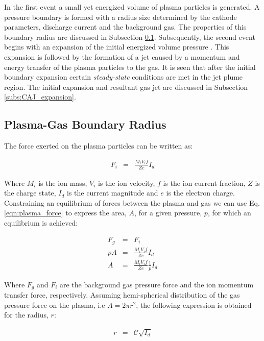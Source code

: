 \documentclass[a4paper]{iacas}%
\begin{document}
In the first event a small yet energized volume of plasma particles is generated. A pressure boundary is formed with a radius size determined by the cathode parameters, discharge current and the background gas. The properties of this boundary radius are discussed in Subsection \ref{subs:boundary_radius}. 
Subsequently, the second event begins with an expansion of the initial energized volume pressure \cite{meunier1987experimental}. This expansion is followed by the formation of a jet caused by a momentum and energy transfer of the plasma particles to the gas. It is seen that after the initial boundary expansion certain \textit{steady-state} conditions are met in the jet plume region. The initial expansion and resultant gas jet are discussed in Subsection \ref{subs:CAJ_expansion}. 

\subsection{Plasma-Gas Boundary Radius}\label{subs:boundary_radius}

The force exerted on the plasma particles can be written as:

\begin{eqnarray}\label{eqn:plasma_force}
	F_i &= &\frac{M_i V_i f}{Z e} I_d
\end{eqnarray}

Where $M_i$ is the ion mass, $V_i$ is the ion velocity, $f$ is the ion current fraction, $Z$ is the charge state, $I_d$ is the current magnitude and $e$ is the electron charge.
Constraining an equilibrium of forces between the plasma and gas we can use Eq. \eqref{eqn:plasma_force} to express the area, $A$, for a given pressure, $p$, for which an equilibrium is achieved:

\begin{eqnarray}\label{}
	F_g & = & F_i \\\label{eqn:rel_equiv_force}
	p A & = & \frac{M_i V_i f}{Z e} I_d\\
	A & = & \frac{M_i V_i f}{Z e} \frac{1}{p} I_d
\end{eqnarray}

Where $F_g$ and $F_i$ are the background gas pressure force and the ion momentum transfer force, respectively. Assuming hemi-spherical distribution of the gas pressure force on the plasma, i.e $A = 2\pi r^2$, the following expression is obtained for the radius, $r$:

\begin{eqnarray}
\label{eqn:rad_equiv_force}
	r & = & \mathcal{C}\sqrt{I_d}
\end{eqnarray}
\end{document}
